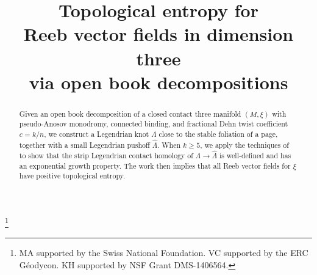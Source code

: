 \documentclass[JEP,XML,SOM,Unicode,NoFloatCountersInSection]{cedram}
\theoremstyle{plain}
\theoremstyle{definition}
\numberwithin{equation}{subsection}
\begin{document}
\frontmatter
\title[Topological entropy for Reeb vector fields]{Topological entropy for\\ Reeb vector fields in dimension three\\ via open book decompositions}

\author[\initial{M.} \middlename{R.R.} \lastname{Alves}]{  }
\address{Département de Mathématique, Université Libre de Bruxelles,\\
CP 218, Boulevard du Triomphe, B-1050 Bruxelles, Belgique}
\urladdr{}

\author[\initial{V.} \lastname{Colin}]{ }
\address{Université de Nantes, UMR 6629 du CNRS\\
44322 Nantes, France}

\author[\initial{K.} \lastname{Honda}]{ }
\address{University of California, Los Angeles\\
Los Angeles, CA 90095, USA}



\thanks{MA supported by the Swiss National Foundation. VC supported by the ERC Géodycon. KH supported by NSF Grant DMS-1406564.}

\begin{abstract}
Given an open book decomposition of a closed contact three manifold $(M,\xi)$ with pseudo-Anosov monodromy, connected binding, and fractional Dehn twist coefficient $c=k/n$, we construct a Legendrian knot $\Lambda$ close to the stable foliation of a page, together with a small Legendrian pushoff $\widehat{\Lambda}$. When $k\geq 5$, we apply the techniques of \cite{CH2} to show that the strip Legendrian contact homology of $\Lambda\rightarrow\widehat{\Lambda}$ is well-defined and has an exponential growth property. The work \cite{Al} then implies that all Reeb vector fields for $\xi$ have positive topological entropy.
\end{abstract}

\end{document}
